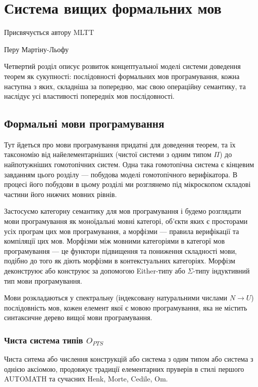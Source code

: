 
\chapter{Система вищих формальних мов}
\epigraph{Присвячується автору MLTT}{Перу Мартіну-Льофу}

Четвертий розділ описує розвиток концептуальної моделі системи доведення теорем як сукупності:
послідовності формальних мов програмування, кожна наступна з яких, складніша за попередню,
має свою операційну семантику, та наслідує усі властивості попередніх мов послідовності.

\section{Формальні мови програмування}
Тут йдеться про мови програмування придатні для доведення теорем,
та їх таксономію від найелементарніших (чистої системи з одним типом $\Pi$) до
найпотужніших гомотопічних систем. Одна така гомотопічна система є кінцевим завданням
цього розділу --- побудова моделі гомотопічного верифікатора.
В процесі його побудови в цьому розділі ми розглянемо під
мікроскопом складові частини його нижчих мовних рівнів.

Застосуємо категорну семантику для мов програмування і будемо розглядати
мови програмування як моноїдальні мовні категорі, об'єкти яких є просторами
усіх програм цих мов програмування, а морфізми --- правила верифікації та компіляції цих мов.
Морфізми між мовними категоріями в категорї мов програмування --- це
функтори підвищення та пониження складності мови, подібно до того як діють
морфізми в контекстуальних категоріях. Морфізм деконструює або конструює за
допомогою Either-типу або $\Sigma$-типу індуктивний тип мови програмування.

Мови розкладаються у спектральну (індексовану натуральними числами $N \rightarrow U$)
послідовність мов, кожен елемент якої є мовою програмування,
яка не містить синтаксичне дерево вищої мови програмування.

\subsection{Чиста система типів $O_{PTS}$}

Чиста ситема або числення конструкцій або система з одим типом або
система з однією аксіомою, продовжує традиції елементарних пруверів
в стилі першого AUTOMATH та сучасних Henk, Morte, Cedile, Om.

